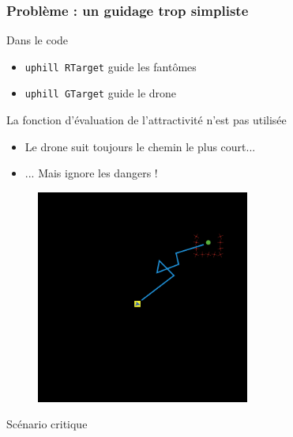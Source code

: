\documentclass{beamer}
\begin{document}
\begin{frame}

  \frametitle{Problème : un guidage trop simpliste}

  \begin{block}{Dans le code}
    \begin{itemize}
    \item{\texttt{uphill RTarget} guide les fantômes}
    \item{\texttt{uphill GTarget} guide le drone}
    \end{itemize}
  \end{block}

  \vfill

  La fonction d'évaluation de l'attractivité n'est pas utilisée
  \begin{itemize}
    \item{Le drone suit toujours le chemin le plus court...}
    \item{... Mais ignore les dangers !}
  \end{itemize}

\end{frame}

\begin{frame}

  \begin{figure}
    \centering
    \includegraphics[width=7cm]{path1.png}
  \end{figure}

  \vfill

  \begin{center}
    Scénario critique
  \end{center}

\end{frame}
\end{document}
